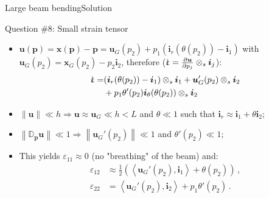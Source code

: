 \documentclass{beamer}
\newcommand{\demi}{\frac{1}{2}}
\newcommand{\imply}{\Rightarrow}
\newcommand{\uj}{u}
\newcommand{\xj}{x}
\newcommand{\uv}{{\boldsymbol\uj}}
\newcommand{\xv}{{\boldsymbol\xj}}
\newcommand{\Grad}{{\mathbb D}}
\renewcommand{\ij}{i}
\newcommand{\pj}{p}
\newcommand{\iv}{{\boldsymbol\ij}}
\newcommand{\pv}{{\boldsymbol\pj}}
\newcommand{\strainj}{\varepsilon}
\newcommand*{\strain}{\mbox{$\hspace{0.2em}\rotatebox[x=0pt,y=0.2pt]{90}{\rule{0.02\linewidth}{0.4pt}}\hspace{-0.23em}\upvarepsilon$}}
\newcommand{\scal}[1]{\left\langle{#1}\right\rangle}
\newcommand{\norm}[1]{\left\|#1\right\|}
\begin{document}
\begin{frame}{Large beam bending}{Solution}

\begin{exampleblock}{Question \#8: Small strain tensor}
\begin{itemize}
\item $\uv(\pv)=\xv(\pv)-\pv=\uv_G(\pj_2)+\pj_1(\iv_r(\theta(\pj_2))-\iv_1)$ with $\uv_G(\pj_2)=\xv_G(\pj_2)-\pj_2\iv_2$, therefore ($\strain=\frac{\partial\uv}{\partial\pj_j}\otimes_s\iv_j$):
\begin{displaymath}
\begin{split}
\strain =&(\iv_r(\theta(\pj_2))-\iv_1)\otimes_s\iv_1+\uv_G'(\pj_2)\otimes_s\iv_2 \\
&+\pj_1\theta'(\pj_2)\iv_\theta(\theta(\pj_2))\otimes_s\iv_2
\end{split}
\end{displaymath}
\item $\norm{\uv}\ll h\imply\uv\approx\uv_G\ll h<L$ and $\theta\ll 1$ such that $\iv_r\approx\iv_1+\theta\iv_2$;
\item $\norm{\Grad_\pv\uv}\ll 1\imply\norm{\uv_G'(\pj_2)}\ll1$ and $\theta'(\pj_2)\ll 1$;
\item This yields $\strainj_{11}\approx 0$ (no "breathing" of the beam) and:
{\footnotesize
\begin{displaymath}
\begin{split}
\strainj_{12} &\approx\demi\left(\scal{\uv_G'(\pj_2),\iv_1}+\theta(\pj_2)\right)\,, \\
\strainj_{22} &=\scal{\uv_G'(\pj_2),\iv_2}+\pj_1\theta'(\pj_2)\,.
\end{split}
\end{displaymath}}
\end{itemize}
\end{exampleblock}

\end{frame}
\end{document}
